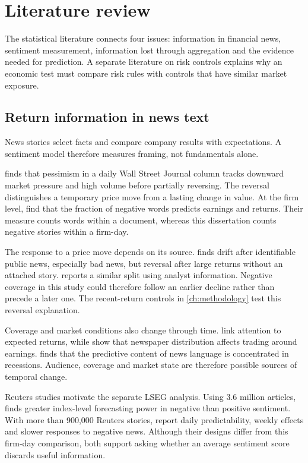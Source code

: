 \chapter{Literature review}
\label{ch:literature}

The statistical literature connects four issues: information in financial news,
sentiment measurement, information lost through aggregation and the evidence
needed for prediction. A separate literature on risk controls explains why an
economic test must compare risk rules with controls that have similar market
exposure.

\section{Return information in news text}

News stories select facts and compare company results with expectations. A
sentiment model therefore measures framing, not fundamentals alone.

\citet{tetlock2007} finds that pessimism in a daily Wall Street Journal column
tracks downward market pressure and high volume before partially reversing. The
reversal distinguishes a temporary price move from a lasting change in value.
At the firm level, \citet{tetlock2008words} find that the fraction of negative
words predicts earnings and returns. Their measure counts words within a
document, whereas this dissertation counts negative stories within a firm-day.

The response to a price move depends on its source. \citet{chan2003news} finds
drift after identifiable public news, especially bad news, but reversal after
large returns without an attached story. \citet{savor2012information} reports a
similar split using analyst information. Negative coverage in this study could
therefore follow an earlier decline rather than precede a later one. The
recent-return controls in \cref{ch:methodology} test this reversal explanation.

Coverage and market conditions also change through time. \citet{fang2009} link
attention to expected returns, while \citet{engelberg2011} show that newspaper
distribution affects trading around earnings. \citet{garcia2013} finds that the
predictive content of news language is concentrated in recessions. Audience,
coverage and market state are therefore possible sources of temporal change.

Reuters studies motivate the separate LSEG analysis. Using 3.6 million articles,
\citet{uhl2014} finds greater index-level forecasting power in negative than
positive sentiment. With more than 900,000 Reuters stories,
\citet{heston2017} report daily predictability, weekly effects and slower
responses to negative news. Although their designs differ from this firm-day
comparison, both support asking whether an average sentiment score discards
useful information.

